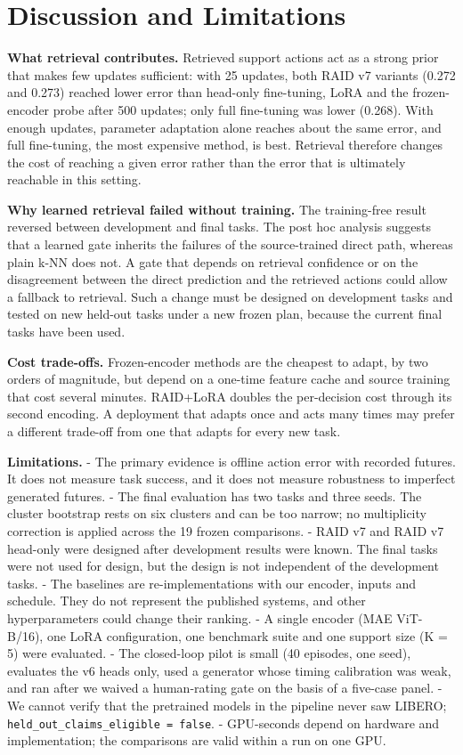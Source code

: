 \documentclass[11pt,a4paper]{article}
\begin{document}
\section{Discussion and Limitations}

\textbf{What retrieval contributes.} Retrieved support actions act as a strong prior that makes few updates sufficient: with 25 updates, both RAID v7 variants (0.272 and 0.273) reached lower error than head-only fine-tuning, LoRA and the frozen-encoder probe after 500 updates; only full fine-tuning was lower (0.268). With enough updates, parameter adaptation alone reaches about the same error, and full fine-tuning, the most expensive method, is best. Retrieval therefore changes the cost of reaching a given error rather than the error that is ultimately reachable in this setting.

\textbf{Why learned retrieval failed without training.} The training-free result reversed between development and final tasks. The post hoc analysis suggests that a learned gate inherits the failures of the source-trained direct path, whereas plain k-NN does not. A gate that depends on retrieval confidence or on the disagreement between the direct prediction and the retrieved actions could allow a fallback to retrieval. Such a change must be designed on development tasks and tested on new held-out tasks under a new frozen plan, because the current final tasks have been used.

\textbf{Cost trade-offs.} Frozen-encoder methods are the cheapest to adapt, by two orders of magnitude, but depend on a one-time feature cache and source training that cost several minutes. RAID+LoRA doubles the per-decision cost through its second encoding. A deployment that adapts once and acts many times may prefer a different trade-off from one that adapts for every new task.

\textbf{Limitations.} - The primary evidence is offline action error with recorded futures. It does not measure task success, and it does not measure robustness to imperfect generated futures. - The final evaluation has two tasks and three seeds. The cluster bootstrap rests on six clusters and can be too narrow; no multiplicity correction is applied across the 19 frozen comparisons. - RAID v7 and RAID v7 head-only were designed after development results were known. The final tasks were not used for design, but the design is not independent of the development tasks. - The baselines are re-implementations with our encoder, inputs and schedule. They do not represent the published systems, and other hyperparameters could change their ranking. - A single encoder (MAE ViT-B/16), one LoRA configuration, one benchmark suite and one support size (K = 5) were evaluated. - The closed-loop pilot is small (40 episodes, one seed), evaluates the v6 heads only, used a generator whose timing calibration was weak, and ran after we waived a human-rating gate on the basis of a five-case panel. - We cannot verify that the pretrained models in the pipeline never saw LIBERO; \texttt{held\_out\_claims\_eligible\ =\ false}. - GPU-seconds depend on hardware and implementation; the comparisons are valid within a run on one GPU.
\end{document}
